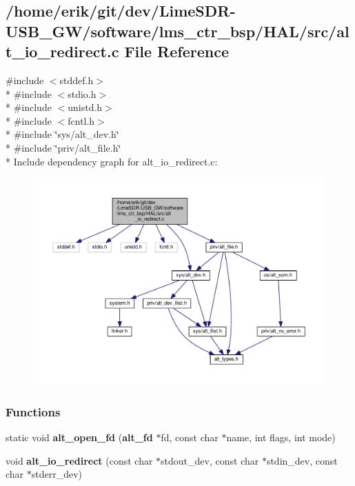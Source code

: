 \subsection{/home/erik/git/dev/\+Lime\+S\+D\+R-\/\+U\+S\+B\+\_\+\+G\+W/software/lms\+\_\+ctr\+\_\+bsp/\+H\+A\+L/src/alt\+\_\+io\+\_\+redirect.c File Reference}
\label{alt__io__redirect_8c}
{\ttfamily \#include $<$stddef.\+h$>$}\\*
{\ttfamily \#include $<$stdio.\+h$>$}\\*
{\ttfamily \#include $<$unistd.\+h$>$}\\*
{\ttfamily \#include $<$fcntl.\+h$>$}\\*
{\ttfamily \#include \char`\"{}sys/alt\+\_\+dev.\+h\char`\"{}}\\*
{\ttfamily \#include \char`\"{}priv/alt\+\_\+file.\+h\char`\"{}}\\*
Include dependency graph for alt\+\_\+io\+\_\+redirect.\+c\+:
\nopagebreak
\begin{figure}[H]
\begin{center}
\leavevmode
\includegraphics[width=350pt]{d7/d4d/alt__io__redirect_8c__incl}
\end{center}
\end{figure}
\subsubsection*{Functions}
\begin{DoxyCompactItemize}
\item 
static void {\bf alt\+\_\+open\+\_\+fd} ({\bf alt\+\_\+fd} $\ast$fd, const char $\ast$name, int flags, int mode)
\item 
void {\bf alt\+\_\+io\+\_\+redirect} (const char $\ast$stdout\+\_\+dev, const char $\ast$stdin\+\_\+dev, const char $\ast$stderr\+\_\+dev)
\end{DoxyCompactItemize}


